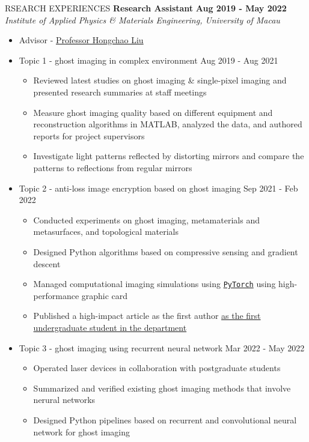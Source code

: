 \documentclass[11pt]{article}
\begin{document}
\begin{section}{RSEARCH EXPERIENCES}
\textbf{Research Assistant} \hfill \textbf{Aug 2019 - May 2022} \\
\textit{Institute of Applied Physics \& Materials Engineering, University of Macau}
\begin{itemize}[leftmargin=1.5em]
    \item Advisor - \href{mailto:hcliu@um.edu.mo}{Professor Hongchao Liu}
    \item Topic 1 - ghost imaging in complex environment  \hfill Aug 2019 - Aug 2021
    \begin{itemize}[leftmargin=1.5em]
        \item Reviewed latest studies on ghost imaging \& single-pixel imaging and presented research summaries at staff meetings
        \item Measure ghost imaging quality based on different equipment and reconstruction algorithms in MATLAB, analyzed the data, and authored reports for project supervisors
        \item Investigate light patterns reflected by distorting mirrors and compare the patterns to reflections from regular mirrors
    \end{itemize}
    \item Topic 2 - anti-loss image encryption based on ghost imaging \hfill Sep 2021 - Feb 2022
    \begin{itemize}[leftmargin=1.5em]
        \item Conducted experiments on ghost imaging, metamaterials and metasurfaces, and topological materials
        \item Designed Python algorithms based on compressive sensing and gradient descent
        \item Managed computational imaging simulations using \href{https://pytorch.org/}{\texttt{PyTorch}} using high-performance graphic card
        \item Published a high-impact article as the first author \href{https://www.tdm.com.mo/en/news-detail/683438?isvideo=false&lang=en&category=all}{as the first undergraduate student in the department} 
    \end{itemize}
    \item Topic 3 - ghost imaging using recurrent neural network  \hfill Mar 2022 - May 2022
    \begin{itemize}[leftmargin=1.5em]
        \item Operated laser devices in collaboration with postgraduate students
        \item Summarized and verified existing ghost imaging methods that involve nerural networks
        \item Designed Python pipelines based on recurrent and convolutional neural network for ghost imaging 
    \end{itemize}
\end{itemize}

\end{section}
\end{document}
